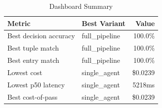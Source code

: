 \begin{table}[htbp]
\centering
\caption{Dashboard Summary}
\label{tab:summary}
\begin{tabular}{l l r}
\toprule
Metric & Best Variant & Value \\
\midrule
  Best decision accuracy & full\_pipeline & 100.0\% \\
  Best tuple match & full\_pipeline & 100.0\% \\
  Best entry match & full\_pipeline & 100.0\% \\
  Lowest cost & single\_agent & \$0.0239 \\
  Lowest p50 latency & single\_agent & 5218ms \\
  Best cost-of-pass & single\_agent & \$0.0239 \\
\bottomrule
\end{tabular}
\end{table}
